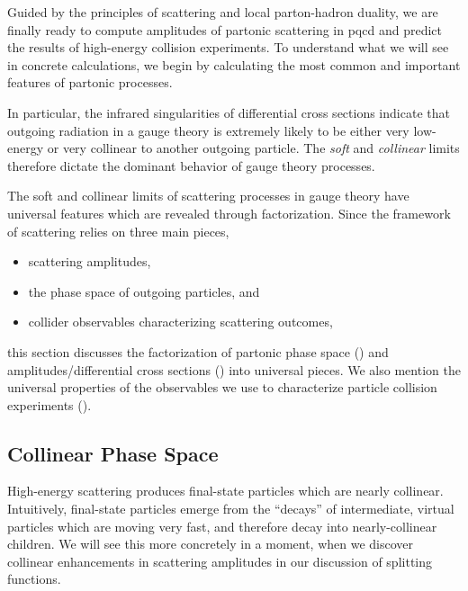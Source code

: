 Guided by the principles of scattering and local parton-hadron duality, we are finally ready to compute amplitudes of partonic scattering in \gls{pqcd} and predict the results of high-energy collision experiments.
%
To understand what we will see in concrete calculations, we begin by calculating the most common and important features of partonic processes.

In particular, the infrared singularities of differential cross sections indicate that outgoing radiation in a gauge theory is extremely likely to be either very low-energy or very collinear to another outgoing particle.
%
The \textit{soft} and \textit{collinear} limits therefore dictate the dominant behavior of gauge theory processes.

The soft and collinear limits of scattering processes in gauge theory have universal features which are revealed through \gls{factorization}.
%
Since the framework of scattering relies on three main pieces,
\begin{itemize}
    \item
        scattering amplitudes,

    \item
        the phase space of outgoing particles, and

    \item
        collider observables characterizing scattering outcomes,
\end{itemize}
this section discusses the factorization of partonic phase space () and amplitudes/differential cross sections () into universal pieces.
%
We also mention the universal properties of the observables we use to characterize particle collision experiments ().



\subsection{Collinear Phase Space}
\label{sec:collinear-phase-space}


High-energy scattering produces final-state particles which are nearly collinear.
%
Intuitively, final-state particles emerge from the ``decays'' of intermediate, virtual particles which are moving very fast, and therefore decay into nearly-collinear children.
%
We will see this more concretely in a moment, when we discover collinear enhancements in scattering amplitudes in our discussion of splitting functions.

